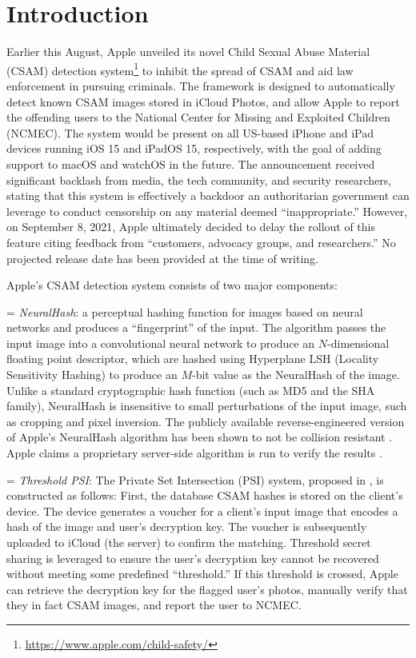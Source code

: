 
\section{Introduction} %
\label{sec:introduction}



Earlier this August, Apple unveiled its novel Child Sexual Abuse Material (CSAM) detection system\footnote{\url{https://www.apple.com/child-safety/}} to inhibit the spread of CSAM and aid law enforcement in pursuing criminals. The framework is designed to automatically detect known CSAM images stored in iCloud Photos, and allow Apple to report the offending users to the National Center for Missing and Exploited Children (NCMEC). The system would be present on all US-based iPhone and iPad devices running iOS 15 and iPadOS 15, respectively, with the goal of adding support to macOS and watchOS in the future. The announcement received significant backlash from media, the tech community, and security researchers, stating that this system is effectively a backdoor an authoritarian government can leverage to conduct censorship on any material deemed ``inappropriate.'' However, on September 8, 2021, Apple ultimately decided to delay the rollout of this feature citing feedback from ``customers, advocacy groups, and researchers.'' No projected release date has been provided at the time of writing.

Apple's CSAM detection system consists of two major components:

\noindent \hangindent=\parindent 
\emph{NeuralHash}: a perceptual hashing function for images based on neural networks and produces a ``fingerprint'' of the input. The algorithm passes the input image into a convolutional neural network to produce an $N$-dimensional floating point descriptor, which are hashed using Hyperplane LSH (Locality Sensitivity Hashing) to produce an $M$-bit value as the NeuralHash of the image. Unlike a standard cryptographic hash function (such as MD5 and the SHA family), NeuralHash is insensitive to small perturbations of the input image, such as cropping and pixel inversion. The publicly available reverse-engineered version of Apple's NeuralHash algorithm has been shown to not be collision resistant \cite{ygvarAppleNeuralHash2ONNX2021}. Apple claims a proprietary server-side algorithm is run to verify the results \cite{cox20201}.

\noindent 
\hangindent=\parindent 
\emph{Threshold PSI}: The Private Set Intersection (PSI) system, proposed in \cite{bhowmick2021apple}, is constructed as follows: First, the database CSAM hashes is stored on the client's device.  The device generates a voucher for a client's input image that encodes a hash of the image and user's decryption key. The voucher is subsequently uploaded to iCloud (the server) to confirm the matching. Threshold secret sharing is leveraged to ensure the user's decryption key cannot be recovered without meeting some predefined ``threshold.'' If this threshold is crossed, Apple can retrieve the decryption key for the flagged user's photos, manually verify that they in fact CSAM images, and report the user to NCMEC. 




